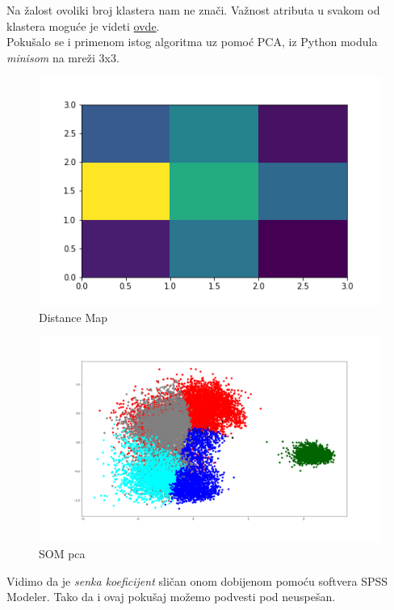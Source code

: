\documentclass[a4paper, 11pt]{article}
\begin{document}
Na \v{z}alost ovoliki broj klastera nam ne zna\v{c}i.
Va\v{z}nost atributa u svakom od klastera mogu\'{c}e je videti 
\href{www.alas.matf.bg.ac.rs/~mi16077/kohonen.jpeg}{ovde}.
\\

Poku\v{s}alo se i primenom istog algoritma uz pomo\'{c} PCA,
iz Python modula \emph{minisom} na mre\v{z}i 3x3.

\begin{figure}[h]
\centering
\graphicspath{{../}}
\includegraphics[scale=0.45]{distance_map_som.png}
\caption{Distance Map}
\end{figure}

\begin{figure}[h]
\centering
\graphicspath{{../}}
\includegraphics[scale=0.15]{som_pca5.png}
\caption{SOM pca}
\end{figure}


Vidimo da je \emph{senka koeficijent} sli\v{c}an onom 
dobijenom pomo\'{c}u softvera SPSS Modeler.
Tako da i ovaj poku\v{s}aj mo\v{z}emo podvesti pod
neuspe\v{s}an.
\end{document}
